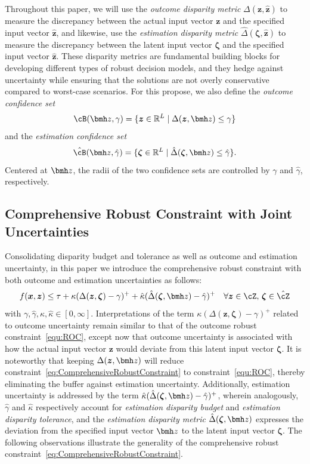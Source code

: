 \documentclass[mnsc, nonblindrev]{informswp}
\newcommand{\1}[1]{\mathds{1}{\left(#1\right)}}
\begin{document}
Throughout this paper, we will use the \textit{outcome disparity metric} $\Delta(\bm z, \hat{\bm z})$ to measure the discrepancy between the actual input vector $\bm z$ and the specified input vector $\hat{\bm z}$, and likewise, use the \textit{estimation disparity metric} $\hat \Delta(\bm \zeta, \hat{\bm z})$ to measure the discrepancy between the latent input vector $\bm \zeta$ and the specified input vector $\hat{\bm z}$. These disparity metrics are fundamental building blocks for developing different types of robust decision models, and they hedge against uncertainty while ensuring that the solutions are not overly conservative compared to worst-case scenarios. For this propose, we also define the {\em outcome confidence set}
$$
\cB(\bmh z, \gamma) = \{ \bm z \in \mathbb{R}^L \;|\; \Delta(\bm z,\bmh z) \leq \gamma \}
$$
and the {\em estimation confidence set}
$$
\hat \cB(\bmh z, 
\hat \gamma) = \{ \bm \zeta \in \mathbb{R}^L \;|\; \hat \Delta(\bm \zeta,\bmh z) \leq \hat \gamma \}. 
$$
Centered at $\bmh z$, the radii of the two confidence sets are controlled by $\gamma$ and $\hat \gamma$, respectively.

\subsection*{Comprehensive Robust Constraint with Joint Uncertainties}

Consolidating disparity budget and tolerance as well as outcome and estimation uncertainty, in this paper we introduce the comprehensive robust constraint with both outcome and estimation uncertainties as follows:
\begin{equation}
\label{eq:ComprehensiveRobustConstraint}
f(\bm x,\bm z) \leq \tau + \kappa (\Delta(\bm z,\bm \zeta) - \gamma)^+ + \hat \kappa (\hat \Delta(\bm \zeta,\bmh z) - \hat \gamma)^+ ~~~\forall \bm z \in \cZ , \, \bm \zeta \in \hat \cZ
\end{equation}
with $\gamma, \hat \gamma, \kappa, \hat \kappa \in [0, \infty]$. Interpretations of the term $\kappa (\Delta(\bm z,\bm \zeta) - \gamma)^+$ related to outcome uncertainty remain similar to that of the outcome robust constraint~\eqref{equ:ROC}, except now that outcome uncertainty is associated with how the actual input vector $\bm z$ would deviate from this latent input vector $\bm{\zeta}$. 
It is noteworthy that keeping $\Delta(\bm z,\bmh z)$ will reduce constraint~\eqref{eq:ComprehensiveRobustConstraint} to constraint~\eqref{equ:ROC}, thereby eliminating the buffer against estimation uncertainty.
Additionally, estimation uncertainty is addressed by the term 
$\hat \kappa (\hat \Delta(\bm \zeta,\bmh z) - \hat \gamma)^+$, wherein analogously, $\hat \gamma$ and $\hat \kappa$ respectively account for \textit{estimation disparity budget} and \textit{estimation disparity  tolerance}, and the \textit{estimation disparity metric} $\hat \Delta(\bm \zeta,\bmh z)$ expresses the deviation from the specified input vector $\bmh z$ to the latent input vector $\bm \zeta$. The following observations illustrate the generality of the comprehensive robust constraint~\eqref{eq:ComprehensiveRobustConstraint}.
\end{document}
